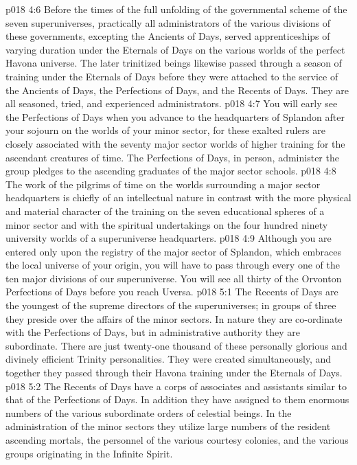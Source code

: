 \vs p018 4:6 Before the times of the full unfolding of the governmental scheme of the seven superuniverses, practically all administrators of the various divisions of these governments, excepting the Ancients of Days, served apprenticeships of varying duration under the Eternals of Days on the various worlds of the perfect Havona universe. The later trinitized beings likewise passed through a season of training under the Eternals of Days before they were attached to the service of the Ancients of Days, the Perfections of Days, and the Recents of Days. They are all seasoned, tried, and experienced administrators.
\pc \vs p018 4:7 You will early see the Perfections of Days when you advance to the headquarters of Splandon after your sojourn on the worlds of your minor sector, for these exalted rulers are closely associated with the seventy major sector worlds of higher training for the ascendant creatures of time. The Perfections of Days, in person, administer the group pledges to the ascending graduates of the major sector schools.
\vs p018 4:8 The work of the pilgrims of time on the worlds surrounding a major sector headquarters is chiefly of an intellectual nature in contrast with the more physical and material character of the training on the seven educational spheres of a minor sector and with the spiritual undertakings on the four hundred ninety university worlds of a superuniverse headquarters.
\vs p018 4:9 Although you are entered only upon the registry of the major sector of Splandon, which embraces the local universe of your origin, you will have to pass through every one of the ten major divisions of our superuniverse. You will see all thirty of the Orvonton Perfections of Days before you reach Uversa.
\vs p018 5:1 The Recents of Days are the youngest of the supreme directors of the superuniverses; in groups of three they preside over the affairs of the minor sectors. In nature they are co\hyp{}ordinate with the Perfections of Days, but in administrative authority they are subordinate. There are just twenty\hyp{}one thousand of these personally glorious and divinely efficient Trinity personalities. They were created simultaneously, and together they passed through their Havona training under the Eternals of Days.
\vs p018 5:2 The Recents of Days have a corps of associates and assistants similar to that of the Perfections of Days. In addition they have assigned to them enormous numbers of the various subordinate orders of celestial beings. In the administration of the minor sectors they utilize large numbers of the resident ascending mortals, the personnel of the various courtesy colonies, and the various groups originating in the Infinite Spirit.
